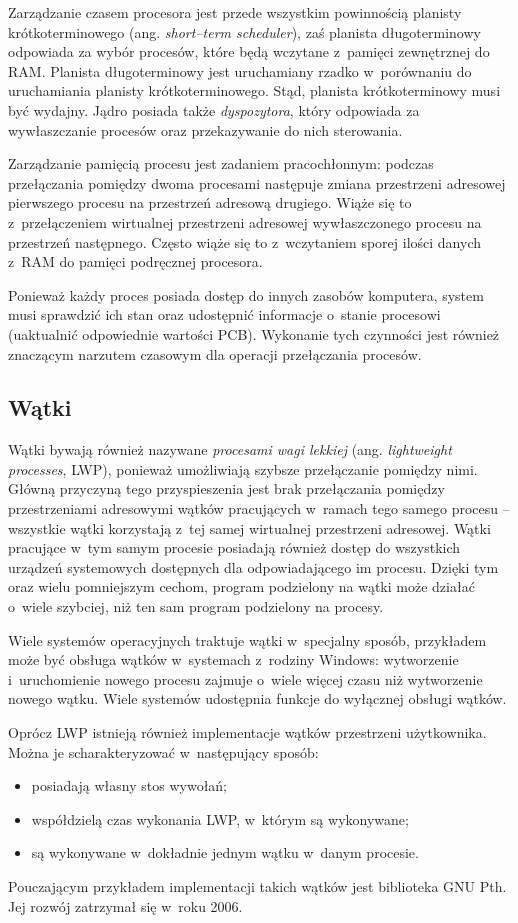 \documentclass[12pt]{mwart}
\begin{document}
\par
%
\indent
  Zarządzanie czasem procesora jest przede wszystkim powinnością planisty krótkoterminowego (ang. \emph{short--term scheduler}),
  zaś planista długoterminowy odpowiada za wybór procesów, które będą wczytane z~pamięci zewnętrznej do RAM. Planista długoterminowy
  jest uruchamiany rzadko w~porównaniu do uruchamiania planisty krótkoterminowego. Stąd, planista krótkoterminowy musi być wydajny.
  Jądro posiada także \emph{dyspozytora}, który odpowiada za wywłaszczanie procesów oraz przekazywanie do nich sterowania.
\par
%
\indent
  Zarządzanie pamięcią procesu jest zadaniem pracochłonnym: podczas przełączania pomiędzy dwoma procesami następuje zmiana 
  przestrzeni adresowej pierwszego procesu na przestrzeń adresową drugiego. Wiąże się to z~przełączeniem wirtualnej przestrzeni adresowej 
  wywłaszczonego procesu na przestrzeń następnego. Często wiąże się to z~wczytaniem sporej ilości danych z~RAM do pamięci podręcznej procesora.
\par
%
\indent
  Ponieważ każdy proces posiada dostęp do innych zasobów komputera, system musi sprawdzić ich stan oraz udostępnić informacje o~stanie procesowi
  (uaktualnić odpowiednie wartości PCB). Wykonanie tych czynności jest również znaczącym narzutem czasowym dla operacji przełączania procesów.
\par
%
\subsection{Wątki}
\indent
  Wątki bywają również nazywane \emph{procesami wagi lekkiej} (ang. \emph{lightweight processes}, LWP), ponieważ umożliwiają szybsze przełączanie
  pomiędzy nimi. Główną przyczyną tego przyspieszenia jest brak przełączania pomiędzy 
  przestrzeniami adresowymi wątków pracujących w~ramach tego samego procesu -- wszystkie wątki korzystają z~tej samej wirtualnej przestrzeni adresowej.
  Wątki pracujące w~tym samym procesie posiadają również dostęp do wszystkich urządzeń systemowych dostępnych dla odpowiadającego im procesu.
  Dzięki tym oraz wielu pomniejszym cechom, program podzielony na wątki może działać o~wiele szybciej, niż ten sam program podzielony na procesy.
\par
%
\indent
  Wiele systemów operacyjnych traktuje wątki w~specjalny sposób, przykładem może być obsługa wątków w~systemach z~rodziny Windows:
  wytworzenie i~uruchomienie nowego procesu zajmuje o~wiele więcej czasu niż wytworzenie nowego wątku. Wiele systemów
  udostępnia funkcje do wyłącznej obsługi wątków.
\par
%
\indent
  Oprócz LWP istnieją również implementacje wątków przestrzeni użytkownika. Można je scharakteryzować w~następujący sposób:
  \begin{itemize}
    \item posiadają własny stos wywołań;
    \item współdzielą czas wykonania LWP, w~którym są wykonywane;
    \item są wykonywane w~dokładnie jednym wątku w~danym procesie.
  \end{itemize}
  Pouczającym przykładem implementacji takich wątków jest biblioteka GNU Pth. Jej rozwój zatrzymał się w~roku 2006.
\par
\end{document}
